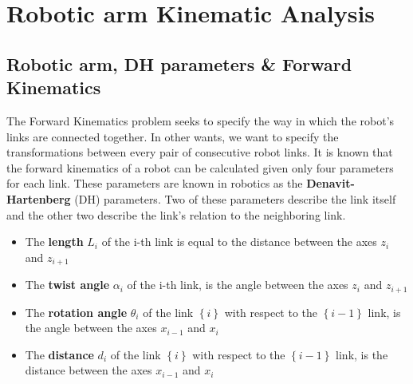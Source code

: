 \section{Robotic arm Kinematic Analysis}


\subsection{Robotic arm, DH parameters \& Forward Kinematics}

The Forward Kinematics problem seeks to specify the way in which the robot's links are connected together. In other wants, we want to specify 
the transformations between every pair of consecutive robot links. It is known that the forward kinematics of a robot can be calculated given only four 
parameters for each link. These parameters are known in robotics as the \textbf{Denavit-Hartenberg} (DH) parameters. Two of these parameters describe the link 
itself and the other two describe the link's relation to the neighboring link.

\begin{itemize}
\item The \textbf{length} $L_i$ of the i-th link is equal to the distance between the axes $z_i$ and $z_{i+1}$
\item The \textbf{twist angle} $α_i$ of the i-th link, is the angle between the axes $z_i$ and $z_{i+1}$
\item The \textbf{rotation angle} $θ_i$ of the link $\left\lbrace i \right\rbrace $ with respect to the $\left\lbrace i-1 \right\rbrace$ link, is the angle 
between the axes $x_{i-1}$ and $x_i$
\item The \textbf{distance} $d_i$ of the link $\left\lbrace i \right\rbrace$ with respect to the $\left\lbrace i-1 \right\rbrace$ link, is the distance 
between the axes $x_{i-1}$ and $x_i$
\end{itemize}

